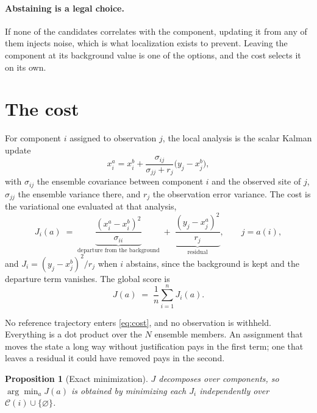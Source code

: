 \documentclass[11pt,a4paper]{article}
\newtheorem{proposition}{Proposition}
\begin{document}
\paragraph{Abstaining is a legal choice.}
If none of the candidates correlates with the component, updating it from any
of them injects noise, which is what localization exists to prevent. Leaving
the component at its background value is one of the options, and the cost
selects it on its own.

\section{The cost}

For component $i$ assigned to observation $j$, the local analysis is the scalar
Kalman update
%
\begin{equation}
  x^{a}_{i} = x^{b}_{i} + \frac{\sigma_{ij}}{\sigma_{jj} + r_{j}}
              \big( y_{j} - x^{b}_{j} \big),
  \label{eq:local}
\end{equation}
%
with $\sigma_{ij}$ the ensemble covariance between component $i$ and the
observed site of $j$, $\sigma_{jj}$ the ensemble variance there, and $r_{j}$
the observation error variance. The cost is the variational one evaluated at
that analysis,
%
\begin{equation}
  J_{i}(a) \;=\;
  \underbrace{\frac{(x^{a}_{i} - x^{b}_{i})^{2}}{\sigma_{ii}}}_{\text{departure from the background}}
  \;+\;
  \underbrace{\frac{(y_{j} - x^{a}_{j})^{2}}{r_{j}}}_{\text{residual}} ,
  \qquad j = a(i),
  \label{eq:cost}
\end{equation}
%
and $J_{i} = (y_{j} - x^{b}_{j})^{2} / r_{j}$ when $i$ abstains, since the
background is kept and the departure term vanishes. The global score is
%
\begin{equation}
  J(a) \;=\; \frac{1}{n}\sum_{i=1}^{n} J_{i}(a).
  \label{eq:global}
\end{equation}

No reference trajectory enters \eqref{eq:cost}, and no observation is withheld.
Everything is a dot product over the $N$ ensemble members. An assignment that
moves the state a long way without justification pays in the first term; one
that leaves a residual it could have removed pays in the second.

\begin{proposition}[Exact minimization]
$J$ decomposes over components, so
$\arg\min_{a} J(a)$ is obtained by minimizing each $J_{i}$ independently over
$\mathcal{C}(i) \cup \{\varnothing\}$.
\end{proposition}
\end{document}
